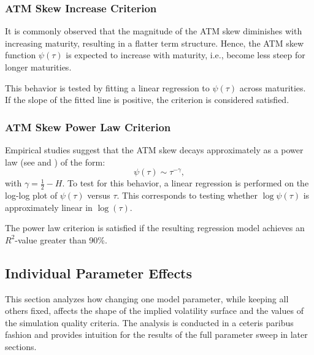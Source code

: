 \subsubsection*{ATM Skew Increase Criterion}
It is commonly observed that the magnitude of the ATM skew diminishes with increasing maturity, resulting in a flatter term structure. Hence, the ATM skew function $\psi(\tau)$ is expected to increase with maturity, i.e., become less steep for longer maturities.

This behavior is tested by fitting a linear regression to $\psi(\tau)$ across maturities. If the slope of the fitted line is positive, the criterion is considered satisfied.

\subsubsection*{ATM Skew Power Law Criterion}
Empirical studies suggest that the ATM skew decays approximately as a power law (see \citealp{Fukasawa2011} and \citealp{GatheralJaissonRosenbaum2018}) of the form:
\begin{equation} \label{eq:PowerLaw}
    \psi(\tau) \sim \tau^{-\gamma},
\end{equation}
with $\gamma = \tfrac{1}{2} - H$. To test for this behavior, a linear regression is performed on the log-log plot of $\psi(\tau)$ versus $\tau$. This corresponds to testing whether $\log \psi(\tau)$ is approximately linear in $\log(\tau)$.

The power law criterion is satisfied if the resulting regression model achieves an $R^2$-value greater than 90\%.


\subsection{Individual Parameter Effects} \label{subsec:IndividualParameterEffects}

This section analyzes how changing one model parameter, while keeping all others fixed, affects the shape of the implied volatility surface and the values of the simulation quality criteria. The analysis is conducted in a ceteris paribus fashion and provides intuition for the results of the full parameter sweep in later sections.

